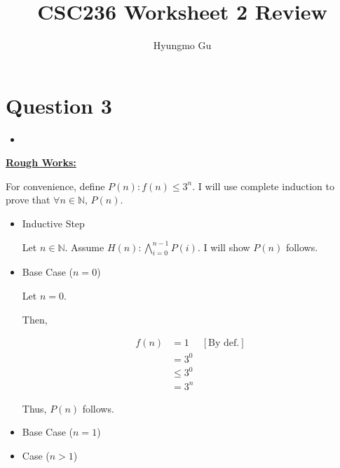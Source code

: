 \documentclass[12pt]{article}
\begin{document}
\title{CSC236 Worksheet 2 Review}
\author{Hyungmo Gu}
\maketitle

\section*{Question 3}

\begin{itemize}
    \item
\end{itemize}

\bigskip

\begin{mdframed}
    \underline{\textbf{Rough Works:}}

    \bigskip

    For convenience, define $P(n): f(n) \leq 3^n$. I will use complete induction to
    prove that $\forall n \in \mathbb{N}$, $P(n)$.

    \bigskip

    \begin{itemize}
        \item Inductive Step

        \begin{mdframed}
        Let $n \in \mathbb{N}$. Assume $H(n): \bigwedge_{i=0}^{n-1} P(i)$. I will
        show $P(n)$ follows.
        \end{mdframed}

        \item Base Case ($n = 0$)

        \begin{mdframed}
        Let $n = 0$.

        \bigskip

        Then,

        \begin{align}
            f(n) &= 1 & [\text{By def.}]\\
            &= 3^0\\
            &\leq 3^0\\
            &= 3^n
        \end{align}

        \bigskip

        Thus, $P(n)$ follows.

        \end{mdframed}

        \item Base Case ($n = 1$)
        \item Case ($n > 1$)
    \end{itemize}

\end{mdframed}
\end{document}
